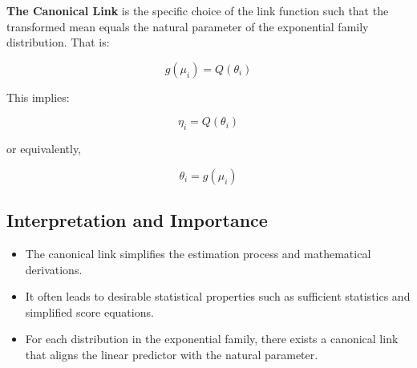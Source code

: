 \documentclass[12pt,a4paper]{article}
\begin{document}
\textbf{The Canonical Link} is the specific choice of the link function such that the transformed mean equals the natural parameter of the exponential family distribution. That is:

\[
g(\mu_i) = Q(\theta_i)
\]

This implies:

\[
\eta_i = Q(\theta_i)
\]

or equivalently,

\[
\theta_i = g(\mu_i)
\]

\subsection*{Interpretation and Importance}

\begin{itemize}
  \item The canonical link simplifies the estimation process and mathematical derivations.
  \item It often leads to desirable statistical properties such as sufficient statistics and simplified score equations.
  \item For each distribution in the exponential family, there exists a canonical link that aligns the linear predictor with the natural parameter.
\end{itemize}
\end{document}
